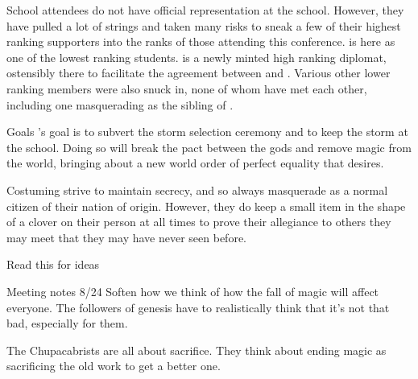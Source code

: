 \documentclass[blue]{GL2020}
\begin{document}


School attendees
\pCult{} do not have official representation at the school. However, they have pulled a lot of strings and taken many risks to sneak a few of their highest ranking supporters into the ranks of those attending this conference. \cCultLeader is here as one of the lowest ranking students. \cTechBishop is a newly minted high ranking diplomat, ostensibly there to facilitate the agreement between \pTech and \pFarm. Various other lower ranking members were also snuck in, none of whom have met each other, including one masquerading as the sibling of \cAmnesiac{}.


Goals
\pCult's goal is to subvert the storm selection ceremony and to keep the storm at the school. Doing so will break the pact between the gods and remove magic from the world, bringing about a new world order of perfect equality that \cCultLeader desires.

Costuming
\pCult strive to maintain secrecy, and so always masquerade as a normal citizen of their nation of origin. However, they do keep a small item in the shape of a clover on their person at all times to prove their allegiance to others they may meet that they may have never seen before.



Read this for ideas \/

Meeting notes 8/24
Soften how we think of how the fall of magic will affect everyone. The followers of genesis have to realistically think that it’s not that bad, especially for them.

The Chupacabrists are all about sacrifice. They think about ending magic as sacrificing the old work to get a better one.
\end{document}
